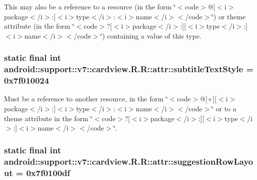 This may also be a reference to a resource (in the form \char`\"{}$<$code$>$@\mbox{[}$<$i$>$package$<$/i$>$:\mbox{]}$<$i$>$type$<$/i$>$:$<$i$>$name$<$/i$>$$<$/code$>$\char`\"{}) or theme attribute (in the form \char`\"{}$<$code$>$?\mbox{[}$<$i$>$package$<$/i$>$:\mbox{]}\mbox{[}$<$i$>$type$<$/i$>$:\mbox{]}$<$i$>$name$<$/i$>$$<$/code$>$\char`\"{}) containing a value of this type. \hypertarget{classandroid_1_1support_1_1v7_1_1cardview_1_1_r_1_1attr_8effa4309320b60c84acc2b393911ab6}{
\subsubsection[{subtitleTextStyle}]{\setlength{\rightskip}{0pt plus 5cm}static final int android::support::v7::cardview.R.R::attr::subtitleTextStyle = 0x7f010024}}
\label{classandroid_1_1support_1_1v7_1_1cardview_1_1_r_1_1attr_8effa4309320b60c84acc2b393911ab6}


Must be a reference to another resource, in the form \char`\"{}$<$code$>$@\mbox{[}+\mbox{]}\mbox{[}$<$i$>$package$<$/i$>$:\mbox{]}$<$i$>$type$<$/i$>$:$<$i$>$name$<$/i$>$$<$/code$>$\char`\"{} or to a theme attribute in the form \char`\"{}$<$code$>$?\mbox{[}$<$i$>$package$<$/i$>$:\mbox{]}\mbox{[}$<$i$>$type$<$/i$>$:\mbox{]}$<$i$>$name$<$/i$>$$<$/code$>$\char`\"{}. \hypertarget{classandroid_1_1support_1_1v7_1_1cardview_1_1_r_1_1attr_f0b35ca6fe4ee558fd47819b71e67b81}{
\subsubsection[{suggestionRowLayout}]{\setlength{\rightskip}{0pt plus 5cm}static final int android::support::v7::cardview.R.R::attr::suggestionRowLayout = 0x7f0100df}}
\label{classandroid_1_1support_1_1v7_1_1cardview_1_1_r_1_1attr_f0b35ca6fe4ee558fd47819b71e67b81}


